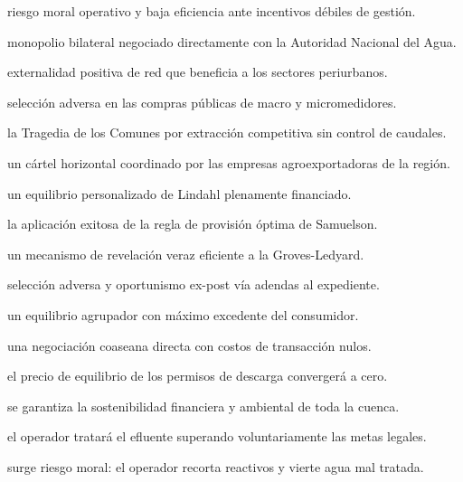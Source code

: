 \begin{opts}
    \item riesgo moral operativo y baja eficiencia ante incentivos débiles de gestión.
    \item monopolio bilateral negociado directamente con la Autoridad Nacional del Agua.
    \item externalidad positiva de red que beneficia a los sectores periurbanos.
    \item selección adversa en las compras públicas de macro y micromedidores.
\end{opts}

\begin{opts}
    \item la Tragedia de los Comunes por extracción competitiva sin control de caudales.
    \item un cártel horizontal coordinado por las empresas agroexportadoras de la región.
    \item un equilibrio personalizado de Lindahl plenamente financiado.
    \item la aplicación exitosa de la regla de provisión óptima de Samuelson.
\end{opts}

\begin{opts}
    \item un mecanismo de revelación veraz eficiente a la Groves-Ledyard.
    \item selección adversa y oportunismo ex-post vía adendas al expediente.
    \item un equilibrio agrupador con máximo excedente del consumidor.
    \item una negociación coaseana directa con costos de transacción nulos.
\end{opts}

\begin{opts}
    \item el precio de equilibrio de los permisos de descarga convergerá a cero.
    \item se garantiza la sostenibilidad financiera y ambiental de toda la cuenca.
    \item el operador tratará el efluente superando voluntariamente las metas legales.
    \item surge riesgo moral: el operador recorta reactivos y vierte agua mal tratada.
\end{opts}

